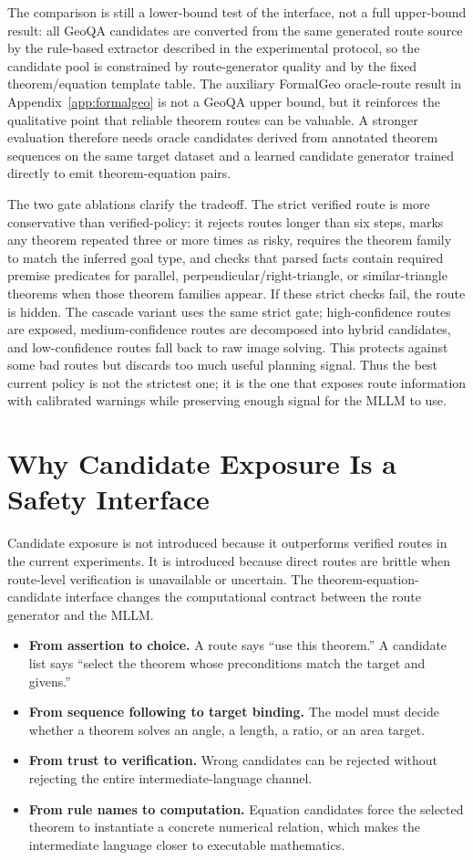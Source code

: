 \documentclass[11pt]{article}
\begin{document}
The comparison is still a lower-bound test of the interface, not a full upper-bound result: all GeoQA candidates are converted from the same generated route source by the rule-based extractor described in the experimental protocol, so the candidate pool is constrained by route-generator quality and by the fixed theorem/equation template table. The auxiliary FormalGeo oracle-route result in Appendix~\ref{app:formalgeo} is not a GeoQA upper bound, but it reinforces the qualitative point that reliable theorem routes can be valuable. A stronger evaluation therefore needs oracle candidates derived from annotated theorem sequences on the same target dataset and a learned candidate generator trained directly to emit theorem-equation pairs.

The two gate ablations clarify the tradeoff. The strict verified route is more conservative than verified-policy: it rejects routes longer than six steps, marks any theorem repeated three or more times as risky, requires the theorem family to match the inferred goal type, and checks that parsed facts contain required premise predicates for parallel, perpendicular/right-triangle, or similar-triangle theorems when those theorem families appear. If these strict checks fail, the route is hidden. The cascade variant uses the same strict gate; high-confidence routes are exposed, medium-confidence routes are decomposed into hybrid candidates, and low-confidence routes fall back to raw image solving. This protects against some bad routes but discards too much useful planning signal. Thus the best current policy is not the strictest one; it is the one that exposes route information with calibrated warnings while preserving enough signal for the MLLM to use.

\section{Why Candidate Exposure Is a Safety Interface}
Candidate exposure is not introduced because it outperforms verified routes in the current experiments. It is introduced because direct routes are brittle when route-level verification is unavailable or uncertain. The theorem-equation-candidate interface changes the computational contract between the route generator and the MLLM.

\begin{itemize}[leftmargin=*]
\item \textbf{From assertion to choice.} A route says ``use this theorem.'' A candidate list says ``select the theorem whose preconditions match the target and givens.''
\item \textbf{From sequence following to target binding.} The model must decide whether a theorem solves an angle, a length, a ratio, or an area target.
\item \textbf{From trust to verification.} Wrong candidates can be rejected without rejecting the entire intermediate-language channel.
\item \textbf{From rule names to computation.} Equation candidates force the selected theorem to instantiate a concrete numerical relation, which makes the intermediate language closer to executable mathematics.
\end{itemize}
\end{document}
